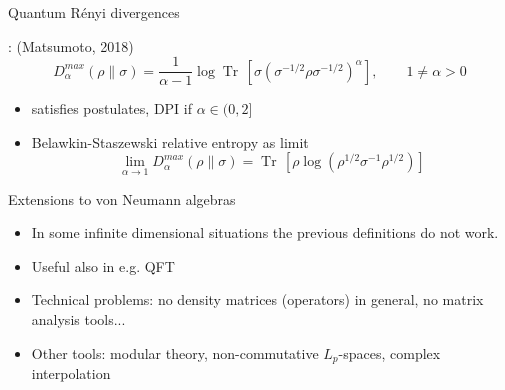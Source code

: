 \documentclass[mathserif]{beamer}
\newcommand{\<}{\langle}
\renewcommand{\>}{\rangle}
\newcommand{\Tr}{\operatorname{Tr}\,}
\begin{document}
\begin{frame}{Quantum R\'enyi divergences}

: {\small (Matsumoto, 2018)}
\[
D_\alpha^{max}(\rho\|\sigma)=\frac{1}{\alpha-1}\log
\Tr\left[\sigma\left(\sigma^{-1/2}\rho\sigma^{-1/2}\right)^\alpha\right],\qquad 1\ne
\alpha>0
\]
\begin{itemize}
\item satisfies postulates, DPI if $\alpha\in (0,2]$
\vskip 3mm
\item Belawkin-Staszewski relative entropy as limit
\[
\lim_{\alpha\to 1}D_\alpha^{max}(\rho\|\sigma)=\Tr\left[\rho
\log\left(\rho^{1/2}\sigma^{-1}\rho^{1/2}\right)\right]
\]


\end{itemize}

\end{frame}


\begin{frame}{Extensions to von Neumann algebras}


\begin{itemize}

\item In some infinite dimensional situations the previous definitions do not work.

\vskip 3mm

\item Useful also in e.g. QFT

\vskip 3mm
\item Technical problems: no density matrices (operators) in general, no matrix analysis
tools...

\vskip 3mm

\item Other tools: modular theory, non-commutative $L_p$-spaces, complex interpolation

\end{itemize}


\end{frame}
\end{document}
